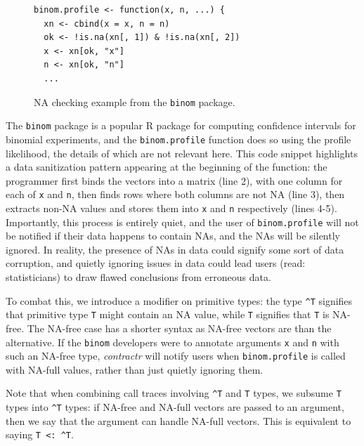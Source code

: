 \documentclass[acmsmall,review,anonymous]{acmart}\settopmatter{printfolios=true,printccs=false,printacmref=false}
\newcommand{\code}[1]{{\lstinline[style=Rin]!#1!}\xspace}
\newcommand{\contractr}{\emph{contractr}\xspace} %
\begin{document}
\begin{figure}[htbp]
\begin{center}

\begin{lstlisting}
binom.profile <- function(x, n, ...) {
  xn <- cbind(x = x, n = n)
  ok <- !is.na(xn[, 1]) & !is.na(xn[, 2])
  x <- xn[ok, "x"]
  n <- xn[ok, "n"]
  ...
\end{lstlisting}

\caption{NA checking example from the \code{binom} package.}
\label{fig:na-example}
\end{center}
\end{figure}

The \code{binom} package is a popular R package for computing confidence intervals for binomial experiments, and the \code{binom.profile} function does so using the profile likelihood, the details of which are not relevant here.
This code snippet highlights a data sanitization pattern appearing at the beginning of the function: the programmer first binds the vectors into a matrix (line 2), with one column for each of \code{x} and \code{n}, then finds rows where both columns are not NA (line 3), then extracts non-NA values and stores them into \code{x} and \code{n} respectively (lines 4-5).
Importantly, this process is entirely quiet, and the user of \code{binom.profile} will not be notified if their data happens to contain NAs, and the NAs will be silently ignored. 
In reality, the presence of NAs in data could signify some sort of data corruption, and quietly ignoring issues in data could lead users (read: statisticians) to draw flawed conclusions from erroneous data.

To combat this, we introduce a modifier on primitive types: the type \code{^T} signifies that primitive type \code{T} might contain an NA value, while \code{T} signifies that \code{T} is NA-free. 
The NA-free case has a shorter syntax as NA-free vectors are  than the alternative.
If the \code{binom} developers were to annotate arguments \code{x} and \code{n} with such an NA-free type, \contractr will notify users when \code{binom.profile} is called with NA-full values, rather than just quietly ignoring them.

Note that when combining call traces involving \code{^T} and \code{T} types, we subsume \code{T} types into \code{^T} types: if NA-free and NA-full vectors are passed to an argument, then we say that the argument can handle NA-full vectors.
This is equivalent to saying \code{T <: ^T}. 
\end{document}
